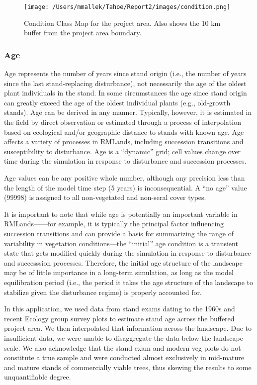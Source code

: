 \begin{figure}[!htbp]
\centering
\texttt{[image: /Users/mmallek/Tahoe/Report2/images/condition.png]}
\caption{Condition Class Map for the project area. Also shows the 10 km buffer from the project area boundary.} 
\label{conditionmap}
\end{figure}

\subsubsection{Age}
Age represents the number of years since stand origin (i.e., the number of years since the last
stand-replacing disturbance), not necessarily the age of the oldest plant individuals in the stand. In some circumstances the age since stand origin can greatly exceed the age of the oldest individual plants (e.g., old-growth stands). Age can be derived in any manner. Typically, however, it is estimated in the field by direct observation or estimated through a process of interpolation based on ecological and/or geographic distance to stands with known age. Age affects a variety of processes in RMLands, including succession transitions and susceptibility to disturbance. Age is a ``dynamic'' grid; cell values change over time during the simulation in response to disturbance and succession processes.

Age values can be any positive whole number, although any precision less than the length of the model time step (5 years) is inconsequential. A “no age” value (99998) is assigned to all non-vegetated and non-seral cover types.

It is important to note that while age is potentially an important variable in RMLands——for example, it is typically the principal factor influencing succession transitions and can provide a basis for summarizing the range of variability in vegetation conditions––the ``initial'' age condition is a transient state that gets modified quickly during the simulation in response to disturbance and successsion processes. Therefore, the initial age structure of the landscape may be of little importance in a long-term simulation, as long as the model equilibration period (i.e., the period it takes the age structure of the landscape to stabilize given the disturbance regime) is properly accounted for.

In this application, we used data from stand exams dating to the 1960s and recent Ecology group survey plots to estimate stand age across the buffered project area. We then interpolated that information across the landscape. Due to insufficient data, we were unable to disaggregate the data below the landscape scale. We also acknowledge that the stand exam and modern veg plots do not constitute a true sample and were conducted almost exclusively in mid-mature and mature stands of commercially viable trees, thus skewing the results to some unquantifiable degree.

